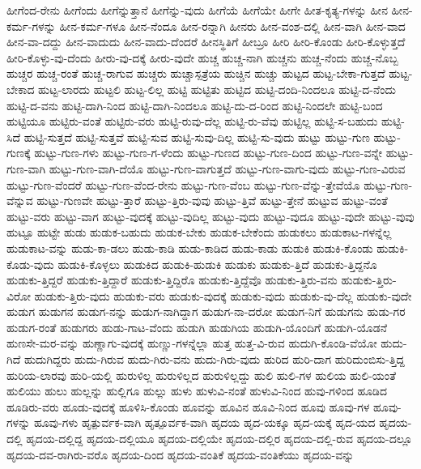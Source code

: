 {ಹೀಗೆಂದ-ರೇನು
ಹೀಗೆಂದು
ಹೀಗೆನ್ನುತ್ತಾನೆ
ಹೀಗೆನ್ನು-ವುದು
ಹೀಗೆಯೆ
ಹೀಗೆಯೇ
ಹೀಗೇ
ಹೀತ-ಕೃತ್ಯ-ಗಳನ್ನು
ಹೀನ
ಹೀನ-ಕರ್ಮ-ಗಳನ್ನು
ಹೀನ-ಕರ್ಮ-ಗಳೂ
ಹೀನ-ನೆಂದೂ
ಹೀನ-ರನ್ನಾಗಿ
ಹೀನರು
ಹೀನ-ವಂಶ-ದಲ್ಲಿ
ಹೀನ-ವಾಗಿ
ಹೀನ-ವಾದ
ಹೀನ-ವಾ-ದದ್ದು
ಹೀನ-ವಾದುದು
ಹೀನ-ವಾದು-ದೆಂದರೆ
ಹೀನಸ್ಥಿತಿಗೆ
ಹೀಬ್ರೂ
ಹೀರಿ
ಹೀರಿ-ಕೊಂಡು
ಹೀರಿ-ಕೊಳ್ಳುತ್ತದೆ
ಹೀರಿ-ಕೊಳ್ಳು-ವು-ದೆಂದು
ಹೀರು-ವು-ದಕ್ಕೆ
ಹೀರು-ವುದೇ
ಹುಚ್ಚ
ಹುಚ್ಚ-ನಾಗಿ
ಹುಚ್ಚನು
ಹುಚ್ಚ-ನೆಂದು
ಹುಚ್ಚ-ನೊಬ್ಬ
ಹುಚ್ಚರ
ಹುಚ್ಚ-ರಂತೆ
ಹುಚ್ಚ-ರಾಗುವ
ಹುಚ್ಚರು
ಹುಚ್ಚಾಸ್ಪತ್ರೆಯ
ಹುಚ್ಚಿನ
ಹುಚ್ಚು
ಹುಟ್ಟದ
ಹುಟ್ಟ-ಬೇಕಾ-ಗುತ್ತದೆ
ಹುಟ್ಟ-ಬೇಕಾದ
ಹುಟ್ಟ-ಲಾರದು
ಹುಟ್ಟಲಿ
ಹುಟ್ಟ-ಲಿಲ್ಲ
ಹುಟ್ಟಿ
ಹುಟ್ಟಿತು
ಹುಟ್ಟಿದ
ಹುಟ್ಟಿ-ದಂದಿ-ನಿಂದಲೂ
ಹುಟ್ಟಿ-ದ-ನೆಂದು
ಹುಟ್ಟಿ-ದ-ವನು
ಹುಟ್ಟಿ-ದಾಗಿ-ನಿಂದ
ಹುಟ್ಟಿ-ದಾಗಿ-ನಿಂದಲೂ
ಹುಟ್ಟಿ-ದು-ದ-ರಿಂದ
ಹುಟ್ಟಿ-ನಿಂದಲೇ
ಹುಟ್ಟಿ-ಬಂದ
ಹುಟ್ಟಿಯೂ
ಹುಟ್ಟಿರು-ವಂತೆ
ಹುಟ್ಟಿರು-ವರು
ಹುಟ್ಟಿ-ರುವು-ದೆಲ್ಲ
ಹುಟ್ಟಿ-ರು-ವೆವು
ಹುಟ್ಟಿಲ್ಲ
ಹುಟ್ಟಿ-ಸ-ಬಹುದು
ಹುಟ್ಟಿ-ಸಿದೆ
ಹುಟ್ಟಿ-ಸುತ್ತದೆ
ಹುಟ್ಟಿ-ಸುತ್ತವೆ
ಹುಟ್ಟಿ-ಸುವ
ಹುಟ್ಟಿ-ಸುವು-ದಿಲ್ಲ
ಹುಟ್ಟಿ-ಸು-ವುದು
ಹುಟ್ಟು
ಹುಟ್ಟು-ಗುಣ
ಹುಟ್ಟು-ಗುಣಕ್ಕೆ
ಹುಟ್ಟು-ಗುಣ-ಗಳು
ಹುಟ್ಟು-ಗುಣ-ಗ-ಳೆಂದು
ಹುಟ್ಟು-ಗುಣದ
ಹುಟ್ಟು-ಗುಣ-ದಿಂದ
ಹುಟ್ಟು-ಗುಣ-ವನ್ನೇ
ಹುಟ್ಟು-ಗುಣ-ವಾಗಿ
ಹುಟ್ಟು-ಗುಣ-ವಾಗಿ-ದೆಯೊ
ಹುಟ್ಟು-ಗುಣ-ವಾಗುತ್ತದೆ
ಹುಟ್ಟು-ಗುಣ-ವಾಗು-ವುದು
ಹುಟ್ಟು-ಗುಣ-ವಿರುವ
ಹುಟ್ಟು-ಗುಣ-ವೆಂದರೆ
ಹುಟ್ಟು-ಗುಣ-ವೆಂದ-ರೇನು
ಹುಟ್ಟು-ಗುಣ-ವೆಂಬ
ಹುಟ್ಟು-ಗುಣ-ವೆನ್ನು-ತ್ತೇವೆಯೊ
ಹುಟ್ಟು-ಗುಣ-ವೆನ್ನುವ
ಹುಟ್ಟು-ಗುಣವೇ
ಹುಟ್ಟು-ತ್ತಾರೆ
ಹುಟ್ಟು-ತ್ತಿರು-ವುವು
ಹುಟ್ಟು-ತ್ತಿವೆ
ಹುಟ್ಟು-ತ್ತೇನೆ
ಹುಟ್ಟುವ
ಹುಟ್ಟು-ವಂತೆ
ಹುಟ್ಟು-ವರು
ಹುಟ್ಟು-ವಾಗ
ಹುಟ್ಟು-ವುದಕ್ಕೆ
ಹುಟ್ಟು-ವುದಿಲ್ಲ
ಹುಟ್ಟು-ವುದು
ಹುಟ್ಟು-ವುದೂ
ಹುಟ್ಟು-ವುದೇ
ಹುಟ್ಟು-ವುವು
ಹುಟ್ಟೂ
ಹುಟ್ಟೇ
ಹುಡು
ಹುಡುಕ-ಬಹುದು
ಹುಡುಕ-ಬೇಕು
ಹುಡುಕ-ಬೇಕೆಂದು
ಹುಡುಕಲು
ಹುಡುಕಾಟ-ಗಳನ್ನೆಲ್ಲ
ಹುಡುಕಾಟ-ವನ್ನು
ಹುಡು-ಕಾ-ಡಲು
ಹುಡು-ಕಾಡಿ
ಹುಡು-ಕಾಡಿದ
ಹುಡು-ಕಾಡು
ಹುಡುಕಿ
ಹುಡುಕಿ-ಕೊಂಡು
ಹುಡುಕಿ-ಕೊಡು-ವುದು
ಹುಡುಕಿ-ಕೊಳ್ಳಲು
ಹುಡುಕಿದ
ಹುಡುಕಿ-ಹುಡುಕಿ
ಹುಡುಕು
ಹುಡುಕು-ತ್ತಿದೆ
ಹುಡುಕು-ತ್ತಿದ್ದನೊ
ಹುಡುಕು-ತ್ತಿದ್ದರೆ
ಹುಡುಕು-ತ್ತಿದ್ದಾರೆ
ಹುಡುಕು-ತ್ತಿದ್ದಿರೊ
ಹುಡುಕು-ತ್ತಿದ್ದೆವೊ
ಹುಡುಕು-ತ್ತಿರು-ವನು
ಹುಡುಕು-ತ್ತಿರು-ವಿರೋ
ಹುಡುಕು-ತ್ತಿರು-ವುದು
ಹುಡುಕು-ವರು
ಹುಡುಕು-ವುದಕ್ಕೆ
ಹುಡುಕು-ವುದು
ಹುಡುಕು-ವು-ದೆಲ್ಲ
ಹುಡುಕು-ವುದೇ
ಹುಡುಗ
ಹುಡುಗನ
ಹುಡುಗ-ನನ್ನು
ಹುಡುಗ-ನಾಗಿದ್ದಾಗ
ಹುಡುಗ-ನಾ-ದರೋ
ಹುಡುಗ-ನಿಗೆ
ಹುಡುಗನು
ಹುಡು-ಗರ
ಹುಡುಗ-ರಂತೆ
ಹುಡುಗರು
ಹುಡು-ಗಾಟ-ವೆಂದು
ಹುಡುಗಿ
ಹುಡುಗಿಯ
ಹುಡುಗಿ-ಯೊಂದಿಗೆ
ಹುಡುಗಿ-ಯೊಡನೆ
ಹುಣಸೇ-ಮರ-ವನ್ನು
ಹುಣ್ಣಾಗು-ವುದಕ್ಕೆ
ಹುಣ್ಣು-ಗಳನ್ನೆಲ್ಲಾ
ಹುತ್ತ
ಹುತ್ತ-ವಿ-ರುವ
ಹುದುಗಿ-ಕೊಂಡಿ-ವೆಯೋ
ಹುದು-ಗಿದೆ
ಹುದುಗಿದ್ದರು
ಹುದು-ಗಿರುವ
ಹುದು-ಗಿರು-ವನು
ಹುದು-ಗಿರು-ವುದು
ಹುರಿದ
ಹುರಿ-ದಾಗ
ಹುರಿದುಂಬಿಸು-ತ್ತಿದ್ದ
ಹುರಿಯ-ಲಾರವು
ಹುರಿ-ಯಲ್ಲಿ
ಹುರುಳಿಲ್ಲ
ಹುರುಳಿಲ್ಲದ
ಹುರುಳಿಲ್ಲದ್ದು
ಹುಲಿ
ಹುಲಿ-ಗಳ
ಹುಲಿಯ
ಹುಲಿ-ಯಂತೆ
ಹುಲಿಯು
ಹುಲು
ಹುಲ್ಲನ್ನು
ಹುಲ್ಲಿಗೂ
ಹುಲ್ಲು
ಹುಳು
ಹುಳುವಿ-ನಂತೆ
ಹುಳುವಿ-ನಿಂದ
ಹುವು-ಗಳಿಂದ
ಹೂಡಿದ
ಹೂಡಿರು-ವರು
ಹೂಡು-ವುದಕ್ಕೆ
ಹೂಳಿಸಿ-ಕೊಂಡು
ಹೂವನ್ನು
ಹೂವಿನ
ಹೂವಿ-ನಿಂದ
ಹೂವು
ಹೂವು-ಗಳ
ಹೂವು-ಗಳನ್ನು
ಹೂವು-ಗಳು
ಹೃತ್ಪುರ್ವಕ-ವಾಗಿ
ಹೃತ್ಪೂರ್ವಕ-ವಾಗಿ
ಹೃದಯ
ಹೃದ-ಯಕ್ಕೂ
ಹೃದ-ಯಕ್ಕೆ
ಹೃದ-ಯದ
ಹೃದಯ-ದಲ್ಲಿ
ಹೃದಯ-ದಲ್ಲಿದ್ದ
ಹೃದಯ-ದಲ್ಲಿಯೂ
ಹೃದಯ-ದಲ್ಲಿಯೇ
ಹೃದಯ-ದಲ್ಲಿರ
ಹೃದಯ-ದಲ್ಲಿ-ರುವ
ಹೃದಯ-ದಲ್ಲೂ
ಹೃದಯ-ದವ-ರಾಗಿರು-ವರೊ
ಹೃದಯ-ದಿಂದ
ಹೃದಯ-ವಂತಿಕೆ
ಹೃದಯ-ವಂತಿಕೆಯು
ಹೃದಯ-ವನ್ನು
}
